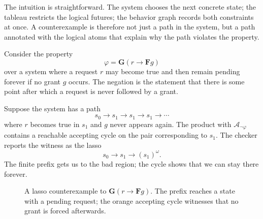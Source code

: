 The intuition is straightforward.  The system chooses the next concrete
state; the tableau restricts the logical futures; the behavior graph records
both constraints at once.  A counterexample is therefore not just a path in the
system, but a path annotated with the logical atoms that explain why the
path violates the property.

\begin{example}
\label{ex:ltl-lasso-counterexample}
Consider the property
\[
  \varphi = \mathbf{G}(r \rightarrow \mathbf{F}g)
\]
over a system where a request $r$ may become true and then remain pending
forever if no grant $g$ occurs.  The negation is the statement that there is
some point after which a request is never followed by a grant.

Suppose the system has a path
\[
  s_0 \to s_1 \to s_1 \to s_1 \to \cdots
\]
where $r$ becomes true in $s_1$ and $g$ never appears again.  The product
with $\mathcal{A}_{\neg\varphi}$ contains a reachable accepting cycle on the
pair corresponding to $s_1$.  The checker reports the witness as the lasso
\[
  s_0 \to s_1 \to (s_1)^\omega.
\]
The finite prefix gets us to the bad region; the cycle shows that we can stay
there forever.
\end{example}

\begin{figure}[ht]
  \centering
  \caption{A lasso counterexample to
           $\mathbf{G}(r \rightarrow \mathbf{F}g)$.  The prefix reaches a
           state with a pending request; the orange accepting cycle witnesses
           that no grant is forced afterwards.}
  \label{fig:request-grant-lasso}
\end{figure}

